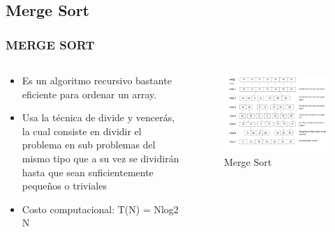 \documentclass[
	11pt, %
]{beamer}
\begin{document}
\subsection{Merge Sort}
\begin{frame}
	\frametitle{MERGE SORT}
    \begin{columns}[t] %
		\begin{column}{0.45\textwidth} %
			 \begin{itemize}
                \item Es un algoritmo recursivo bastante eficiente para ordenar un array.
                \item Usa la técnica de divide y vencerás, la cual consiste en dividir el problema en sub problemas del mismo tipo que a su vez se dividirán hasta que sean suficientemente pequeños o triviales
                \item Costo computacional: T(N) = Nlog2 N
        \end{itemize}
		\end{column}		
		\begin{column}{0.5\textwidth} %
			\begin{figure}
		      \includegraphics[width=0.8\linewidth]{mergesort.png}
		      \caption{Merge Sort}
	   \end{figure}
		
		\end{column}
	\end{columns}
\end{frame}
\end{document}
